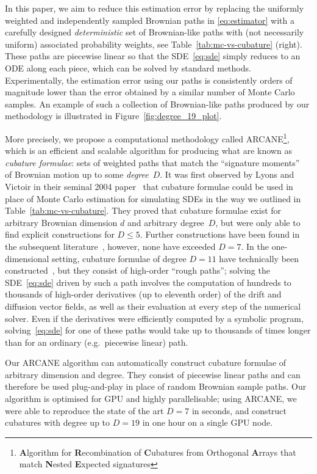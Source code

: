 \documentclass[11pt, letterpaper]{article}
\theoremstyle{definition}
\theoremstyle{remark}
\newcommand{\short}{ARCANE\xspace}
\newcommand{\longg}{\textbf{A}lgorithm for \textbf{R}ecombination of \textbf{C}ubatures from Orthogonal \textbf{A}rrays that match \textbf{N}ested \textbf{E}xpected signatures}
\begin{document}
In this paper, we aim to reduce this estimation error by replacing the uniformly weighted and independently sampled Brownian paths in \eqref{eq:estimator} with a carefully designed \emph{deterministic} set of Brownian-like paths with (not necessarily uniform) associated probability weights, see Table~\ref{tab:mc-vs-cubature} (right). 
These paths are piecewise linear so that the SDE~\eqref{eq:sde} simply reduces to an ODE along each piece, which can be solved by standard methods.
Experimentally, the estimation error using our paths is consistently orders of magnitude lower than the error obtained by a similar number of Monte Carlo samples.
An example of such a collection of Brownian-like paths produced by our methodology is illustrated in Figure~\ref{fig:degree_19_plot}.

More precisely, we propose a computational methodology called \short\footnote{\longg}, which is an efficient and scalable algorithm for producing what are known as \emph{cubature formulae}: sets of weighted paths that match the ``signature moments''~\cite{chevyrev2022signature} of Brownian motion up to some \emph{degree}~$D$. It was first observed by Lyons and Victoir in their seminal 2004 paper~\cite{lyons2004cubature} that cubature formulae could be used in place of Monte Carlo estimation for simulating SDEs in the way we outlined in Table~\ref{tab:mc-vs-cubature}. They proved that cubature formulae exist for arbitrary Brownian dimension $d$ and arbitrary degree~$D$, but were only able to find explicit constructions for $D \le 5$.
Further constructions have been found in the subsequent literature~\cite{gyurko2011cubature, shinozaki2017cubature, hayakawa2022cubature, malyarenko2022cubature, ferrucci2026cubature}, however, none have exceeded $D=7$.
In the one-dimensional setting, cubature formulae of degree $D=11$ have technically been constructed~\cite{gyurko2011cubature}, but they consist of high-order ``rough paths'';
solving the SDE~\eqref{eq:sde} driven by such a path involves the computation of hundreds to thousands of high-order derivatives (up to eleventh order) of the drift and diffusion vector fields, as well as their evaluation at every step of the numerical solver. Even if the derivatives were efficiently computed by a symbolic program, solving~\eqref{eq:sde} for one of these paths would take up to thousands of times longer than for an ordinary (e.g.~piecewise linear) path.

Our \short algorithm can automatically construct cubature formulae of arbitrary dimension and degree.
They consist of piecewise linear paths and can therefore be used plug-and-play in place of random Brownian sample paths.
Our algorithm is optimised for GPU and highly parallelisable; using \short, we were able to reproduce the state of the art $D=7$ in seconds, and construct cubatures with degree up to $D=19$ in one hour on a single GPU node.
\end{document}
